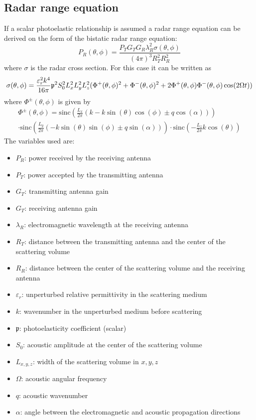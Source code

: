 \documentclass[10pt,a4paper,draft]{scrartcl}
\begin{document}
	\subsection{Radar range equation}
	If a scalar photoelastic relationship is assumed a radar range equation can be derived on the form of the bistatic radar range equation:
	\begin{equation*}
	P_R(\theta,\phi) = \frac{P_T G_T G_R \lambda_R^2 \sigma(\theta,\phi)}{(4\pi)^3 R_T^2 R_R^2}
	\end{equation*}
	where $\sigma$ is the radar cross section. For this case it can be written as
	\begin{equation*}
	\sigma(\theta,\phi) = \frac{\varepsilon_r^2 k^4}{16\pi} \mathfrak{p}^2 S_0^2 L_x^2 L_y^2 L_z^2 ( \Phi^+(\theta,\phi)^2 + \Phi^-(\theta,\phi)^2 \\
	+ 2\Phi^+(\theta,\phi) \Phi^-(\theta,\phi) \cos(2\Omega t) )
	\end{equation*}
	where $\Phi^\pm(\theta,\phi)$ is given by
	\begin{multline*}
	\Phi^\pm(\theta,\phi) = \text{sinc} \left( \frac{L_x}{2\pi} \left( k - k\sin(\theta)\cos(\phi) \pm q\cos(\alpha) \right) \right) \\
	\cdot \text{sinc} \left( \frac{L_y}{2\pi} \left( -k\sin(\theta)\sin(\phi) \pm q\sin(\alpha) \right) \right) 
	\cdot \text{sinc} \left( -\frac{L_z}{2\pi} k\cos(\theta) \right)
	\end{multline*}
	The variables used are:
	\begin{itemize}
		\item $P_R$: power received by the receiving antenna
		\item $P_T$: power accepted by the transmitting antenna
		\item $G_T$: transmitting antenna gain
		\item $G_T$: receiving antenna gain
		\item $\lambda_R$: electromagnetic wavelength at the receiving antenna
		\item $R_T$: distance between the transmitting antenna and the center of the scattering volume
		\item $R_R$: distance between the center of the scattering volume and the receiving antenna
		\item $\varepsilon_r$: unperturbed relative permittivity in the scattering medium
		\item $k$: wavenumber in the unperturbed medium before scattering
		\item $\mathfrak{p}$: photoelasticity coefficient (scalar)
		\item $S_0$: acoustic amplitude at the center of the scattering volume
		\item $L_{x,y,z}$: width of the scattering volume in $x,y,z$
		\item $\Omega$: acoustic angular frequency
		\item $q$: acoustic wavenumber
		\item $\alpha$: angle between the electromagnetic and acoustic propagation directions
	\end{itemize}
\end{document}

